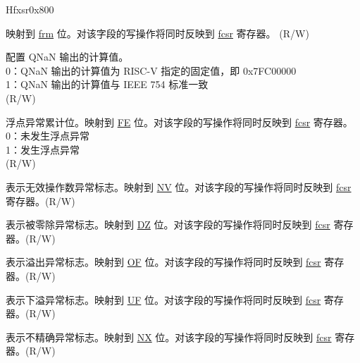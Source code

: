 \begin{register}{H}{fxsr}{0x800}\label{regdesc:FXCR}
%
%
%
%
%
%
%
%
%
%
\regnewline%
\begin{regdesc}\begin{reglist}
\label{fielddesc:RM}\item [RM] 映射到 \hyperref[regdesc:FCSR]{frm} 位。对该字段的写操作将同时反映到 \hyperref[regdesc:FCSR]{fcsr} 寄存器。 (R/W)
\label{fielddesc:DQNaN}\item [DQNaN] 配置 QNaN 输出的计算值。\\
0：QNaN 输出的计算值为 RISC-V 指定的固定值，即 0x7FC00000\\
1：QNaN 输出的计算值与 IEEE 754 标准一致\\
(R/W)
\label{fielddesc:FE}\item [FE] 浮点异常累计位。映射到 \hyperref[regdesc:FCSR]{FE} 位。对该字段的写操作将同时反映到 \hyperref[regdesc:FCSR]{fcsr} 寄存器。\\
0：未发生浮点异常\\
1：发生浮点异常\\
(R/W)
\label{fielddesc:NV}\item [NV] 表示无效操作数异常标志。映射到 \hyperref[regdesc:FCSR]{NV} 位。对该字段的写操作将同时反映到 \hyperref[regdesc:FCSR]{fcsr} 寄存器。(R/W)
\label{fielddesc:DZ}\item [DZ] 表示被零除异常标志。映射到 \hyperref[regdesc:FCSR]{DZ} 位。对该字段的写操作将同时反映到 \hyperref[regdesc:FCSR]{fcsr} 寄存器。(R/W)
\label{fielddesc:OF}\item [OF] 表示溢出异常标志。映射到 \hyperref[regdesc:FCSR]{OF} 位。对该字段的写操作将同时反映到 \hyperref[regdesc:FCSR]{fcsr} 寄存器。(R/W)
\label{fielddesc:UF}\item [UF] 表示下溢异常标志。映射到 \hyperref[regdesc:FCSR]{UF} 位。对该字段的写操作将同时反映到 \hyperref[regdesc:FCSR]{fcsr} 寄存器。(R/W)
\label{fielddesc:NX}\item [NX] 表示不精确异常标志。映射到 \hyperref[regdesc:FCSR]{NX} 位。对该字段的写操作将同时反映到 \hyperref[regdesc:FCSR]{fcsr} 寄存器。(R/W)
\end{reglist}\end{regdesc}
\end{register}

